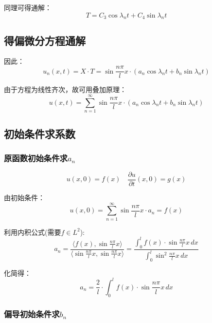 \documentclass[12pt,a4paper]{article}
\numberwithin{subsection}{section}   %
\numberwithin{subsubsection}{subsection}
\theoremstyle{plain}
\theoremstyle{definition}
\theoremstyle{remark}
\theoremstyle{verification}
\begin{document}
	同理可得通解：
	\begin{equation}
		T = C_3 \cos \lambda_n t + C_4 \sin \lambda_n t
	\end{equation}
	
	\subsection{得偏微分方程通解}
	因此：
	\begin{equation}
		u_n(x, t) = X \cdot T = \sin \frac{n\pi}{l} x \cdot (a_n \cos \lambda_n t + b_n \sin \lambda_n t)
	\end{equation}
	
	由于方程为线性齐次，故可用叠加原理：
	\begin{equation}
		u(x, t) = \sum_{n=1}^{\infty} \sin \frac{n\pi}{l} x \cdot (a_n \cos \lambda_n t + b_n \sin \lambda_n t)
	\end{equation}
	
\subsection{初始条件求系数}
	\subsubsection{原函数初始条件求$a_n$}
	
	\begin{equation}
		u(x, 0) = f(x) \quad \frac{\partial u}{\partial t}(x, 0) = g(x)
	\end{equation}
	
	由初始条件：
	\begin{equation}
		u(x, 0) = \sum_{n=1}^{\infty} \sin \frac{n\pi}{l} x \cdot a_n = f(x)
	\end{equation}
	
	利用内积公式(需要$f \in L^2$):
	\begin{equation}
		a_n = \frac{\langle f(x), \sin \frac{n\pi}{l} x \rangle}{\langle \sin \frac{n\pi}{l} x, \sin \frac{n\pi}{l} x \rangle} = \frac{\int_0^l f(x) \cdot \sin \frac{n\pi}{l} x \, dx}{\int_0^l \sin^2 \frac{n\pi}{l} x \, dx}
	\end{equation}
	
	化简得：
	\begin{equation}
		a_n = \frac{2}{l} \cdot \int_0^l f(x) \cdot \sin \frac{n\pi}{l} x \, dx
	\end{equation}
	
	\subsubsection{偏导初始条件求$b_n$}
	
\end{document}
